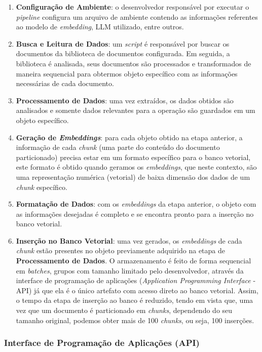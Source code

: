 \documentclass[a4paper, 12pt]{article}
\begin{document}
    \begin{enumerate}
        \item \textbf{Configuração de Ambiente}: o desenvolvedor responsável por executar o \textit{pipeline} configura um arquivo de ambiente contendo as informações referentes ao modelo de \textit{embedding}, LLM utilizado, entre outros.
        \item \textbf{Busca e Leitura de Dados}: um \textit{script} é responsável por buscar os documentos da biblioteca de documentos configurada. Em seguida, a biblioteca é analisada, seus documentos são processados e transformados de maneira sequencial para obtermos objeto específico com as informações necessárias de cada documento.
        \item \textbf{Processamento de Dados}: uma vez extraídos, os dados obtidos são analisados e somente dados relevantes para a operação são guardados em um objeto específico.
        \item \textbf{Geração de \textit{Embeddings}}: para cada objeto obtido na etapa anterior, a informação de cada \textit{chunk} (uma parte do conteúdo do documento particionado) precisa estar em um formato específico para o banco vetorial, este formato é obtido quando geramos os \textit{embeddings}, que neste contexto, são uma representação numérica (vetorial) de baixa dimensão dos dados de um \textit{chunk} específico.
        \item \textbf{Formatação de Dados}: com os \textit{embeddings} da etapa anterior, o objeto com as informações desejadas é completo e se encontra pronto para a inserção no banco vetorial.
        \item \textbf{Inserção no Banco Vetorial}: uma vez gerados, os \textit{embeddings} de cada \textit{chunk} estão presentes no objeto previamente adquirido na etapa de \textbf{Processamento de Dados}. O armazenamento é feito de forma sequencial em \textit{batches}, grupos com tamanho limitado pelo desenvolvedor, através da interface de programação de aplicações (\textit{Application Programming Interface} - API) já que ela é o único artefato com acesso direto ao banco vetorial. Assim, o tempo da etapa de inserção ao banco é reduzido, tendo em vista que, uma vez que um documento é particionado em \textit{chunks}, dependendo do seu tamanho original, podemos obter mais de 100 \textit{chunks}, ou seja, 100 inserções.
    \end{enumerate}
    
    \subsubsection{Interface de Programação de Aplicações (API)} \label{sec:api_concept}
\end{document}
